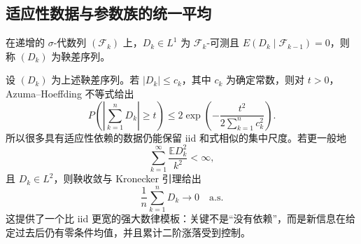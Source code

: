 \subsection{适应性数据与参数族的统一平均}
\begin{definition}[鞅差序列]
在递增的 $\sigma$-代数列 $(\mathcal F_k)$ 上，$D_k\in L^1$ 为 $\mathcal F_k$-可测且 $E(D_k\mid\mathcal F_{k-1})=0$，则称 $(D_k)$ 为鞅差序列。
\end{definition}
\begin{proposition}[鞅差的集中与强平均收敛]
设 $(D_k)$ 为上述鞅差序列。若 $|D_k|\le c_k$，其中 $c_k$ 为确定常数，则对 $t>0$，Azuma--Hoeffding 不等式给出
\begin{equation*}P\!\left(
\left|\sum_{k=1}^nD_k\right|\ge t
\right)
\le
2\exp\!\left(
-\frac{t^2}{2\sum_{k=1}^nc_k^2}
\right).\end{equation*}
所以很多具有适应性依赖的数据仍能保留 iid 和式相似的集中尺度。若更一般地
\[
\sum_{k=1}^\infty\frac{\mathbb E D_k^2}{k^2}<\infty,
\]
且 $D_k\in L^2$，则鞅收敛与 Kronecker 引理给出
\[
\frac1n\sum_{k=1}^nD_k\to0
\quad\text{a.s.}
\]
这提供了一个比 iid 更宽的强大数律模板：关键不是“没有依赖”，而是新信息在给定过去后仍有零条件均值，并且累计二阶涨落受到控制。

\end{proposition}
